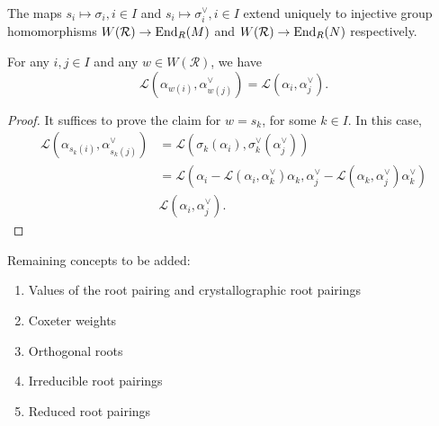 The maps $s_i \mapsto \sigma_i, i \in I$ and $s_i \mapsto \sigma_i^\vee, i \in I$ extend uniquely
to injective group homomorphisms $W(\mathcal{R}) \to {\rm End}_R(M)$ and $W(\mathcal{R}) \to {\rm End}_R(N)$
respectively. 

\begin{lemma}
    For any $i,j \in I$ and any $w \in W(\mathcal{R})$, we have 
    \[
        \mathcal{L}(\alpha_{w(i)},\alpha^\vee_{w(j)}) = \mathcal{L}(\alpha_{i},\alpha_j^\vee).
    \]
\end{lemma}
\begin{proof}
    It suffices to prove the claim for $w = s_k$, for some $k \in I$. In this case, 
    \begin{align*}
        \mathcal{L}(\alpha_{s_k(i)},\alpha^\vee_{s_k(j)}) &=  \mathcal{L}(\sigma_k(\alpha_{i}),\sigma_k^\vee(\alpha^\vee_{j}))\\
                                &= \mathcal{L}(\alpha_{i} - \mathcal{L}(\alpha_i,\alpha_k^\vee)\alpha_k,\alpha^\vee_{j} - \mathcal{L}(\alpha_k,\alpha_j^\vee) \alpha_k^\vee)\\
                            & \mathcal{L}(\alpha_{i},\alpha^\vee_{j}).
    \end{align*}
\end{proof}




Remaining concepts to be added:
\begin{enumerate}
    \item Values of the root pairing and crystallographic root pairings
    \item Coxeter weights
    \item Orthogonal roots 
    \item Irreducible root pairings
    \item Reduced root pairings
\end{enumerate}